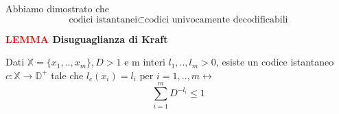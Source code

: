 \documentclass[12pt]{report}
\begin{document}
    \noindent
    Abbiamo dimostrato che $$\text{codici istantanei} \subset \text{codici univocamente decodificabili}$$



    \vspace{5px}
    \begin{tcolorbox}
        \textbf{\textcolor{red}{LEMMA} Disuguaglianza di Kraft}
        \begin{center}
            Dati $ \mathbb{X} = \{x_1,..,x_m\}, D > 1$ e m interi $l_1,..,l_m > 0$, esiste un codice istantaneo $c: \mathbb{X} \rightarrow \mathbb{D}^+$ tale che $l_c(x_i) = l_i$ per $i = 1,..,m \leftrightarrow $ $$\sum_{i = 1}^m D^{-l_i} \leq 1$$
        \end{center}
    \end{tcolorbox}

    \vspace{5px}
\end{document}
